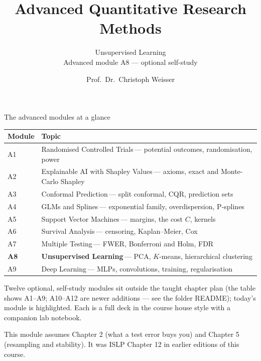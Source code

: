 \documentclass[aspectratio=169,11pt]{beamer}
\title{Advanced Quantitative Research Methods}
\subtitle{Unsupervised Learning\\[2pt]{\small Advanced module A8 --- optional self-study}}
\author{Prof.\ Dr.\ Christoph Weisser}
\date{}\graphicspath{{images/}}
\begin{document}
\begin{frame}[plain]\titlepage\end{frame}

\begin{frame}{The advanced modules at a glance}
  \vspace{-1.5mm}
  \begin{center}
  \scriptsize
  \setlength{\tabcolsep}{5pt}
  \renewcommand{\arraystretch}{1.30}
  \begin{tabular}{@{\hspace{2pt}}l >{\raggedright\arraybackslash}p{}@{\hspace{2pt}}}
    \toprule
    \textbf{Module} & \textbf{Topic} \\
    \midrule
     {\color{accent}A1} & Randomised Controlled Trials\,{\color{black!45}--- potential outcomes, randomisation, power} \\
    \rowcolor{black!3} {\color{accent}A2} & Explainable AI with Shapley Values\,{\color{black!45}--- axioms, exact and Monte-Carlo Shapley} \\
     {\color{accent}A3} & Conformal Prediction\,{\color{black!45}--- split conformal, CQR, prediction sets} \\
    \rowcolor{black!3} {\color{accent}A4} & GLMs and Splines\,{\color{black!45}--- exponential family, overdispersion, P-splines} \\
     {\color{accent}A5} & Support Vector Machines\,{\color{black!45}--- margins, the cost $C$, kernels} \\
    \rowcolor{black!3} {\color{accent}A6} & Survival Analysis\,{\color{black!45}--- censoring, Kaplan--Meier, Cox} \\
     {\color{accent}A7} & Multiple Testing\,{\color{black!45}--- FWER, Bonferroni and Holm, FDR} \\
    \rowcolor{accent!18} \textbf{A8} & \textbf{Unsupervised Learning}\,{\color{accent!75!black}--- PCA, $K$-means, hierarchical clustering} \\
     {\color{accent}A9} & Deep Learning\,{\color{black!45}--- MLPs, convolutions, training, regularisation} \\
    \bottomrule
  \end{tabular}
  \end{center}
  \vspace{2mm}
  {\scriptsize Twelve optional, self-study modules sit outside the taught
  chapter plan (the table shows A1--A9; A10--A12 are newer additions --- see the folder README); today's module is highlighted. Each is a full deck in the course
  house style with a companion lab notebook.\par\medskip This module assumes Chapter 2 (what a test error buys you) and Chapter 5 (resampling and stability). It was ISLP Chapter 12 in earlier editions of this course.}
\end{frame}
\end{document}

